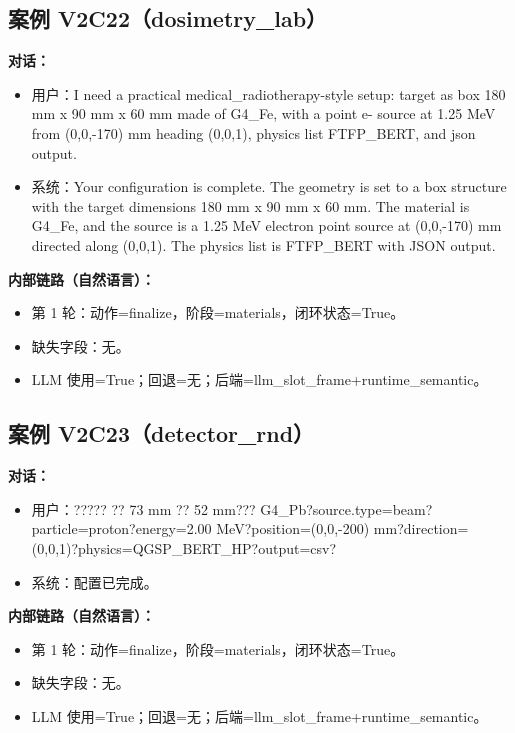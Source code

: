 \documentclass[11pt]{ctexart}
\begin{document}
\subsection{案例 V2C22（dosimetry\_lab）}
\textbf{对话：}
\begin{itemize}
\item 用户：I need a practical medical\_radiotherapy-style setup: target as box 180 mm x 90 mm x 60 mm made of G4\_Fe, with a point e- source at 1.25 MeV from (0,0,-170) mm heading (0,0,1), physics list FTFP\_BERT, and json output.
\item 系统：Your configuration is complete. The geometry is set to a box structure with the target dimensions 180 mm x 90 mm x 60 mm. The material is G4\_Fe, and the source is a 1.25 MeV electron point source at (0,0,-170) mm directed along (0,0,1). The physics list is FTFP\_BERT with JSON output.
\end{itemize}
\textbf{内部链路（自然语言）：}
\begin{itemize}
\item 第 1 轮：动作=finalize，阶段=materials，闭环状态=True。
\item 缺失字段：无。
\item LLM 使用=True；回退=无；后端=llm\_slot\_frame+runtime\_semantic。
\end{itemize}
\subsection{案例 V2C23（detector\_rnd）}
\textbf{对话：}
\begin{itemize}
\item 用户：????? ?? 73 mm ?? 52 mm??? G4\_Pb?source.type=beam?particle=proton?energy=2.00 MeV?position=(0,0,-200) mm?direction=(0,0,1)?physics=QGSP\_BERT\_HP?output=csv?
\item 系统：配置已完成。
\end{itemize}
\textbf{内部链路（自然语言）：}
\begin{itemize}
\item 第 1 轮：动作=finalize，阶段=materials，闭环状态=True。
\item 缺失字段：无。
\item LLM 使用=True；回退=无；后端=llm\_slot\_frame+runtime\_semantic。
\end{itemize}
\end{document}
